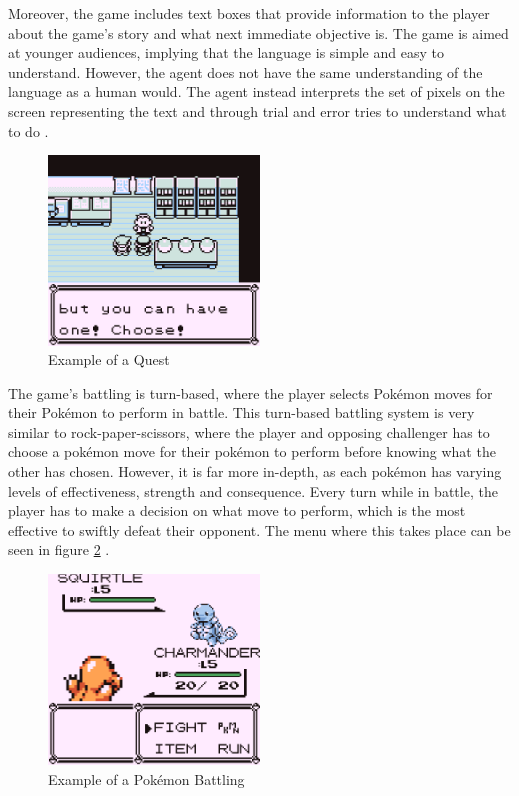 Moreover, the game includes text boxes that provide information to the player about the game's story and what next immediate objective is. The game is aimed at younger audiences, implying that the language is simple and easy to understand. However, the agent does not have the same understanding of the language as a human would. The agent instead interprets the set of pixels on the screen representing the text and through trial and error tries to understand what to do \cite{HubZ_1998}. 

\begin{figure}[H]
    \centering
    \includegraphics[width=0.5\textwidth]{figures/red_quest_example.png}
    \caption{Example of a Quest}
    \label{fig:pkmn_quest}
\end{figure}

The game's battling is turn-based, where the player selects Pokémon moves for their Pokémon to perform in battle. This turn-based battling system is very similar to rock-paper-scissors, where the player and opposing challenger has to choose a pokémon move for their pokémon to perform before knowing what the other has chosen. However, it is far more in-depth, as each pokémon has varying levels of effectiveness, strength and consequence. Every turn while in battle, the player has to make a decision on what move to perform, which is the most effective to swiftly defeat their opponent. The menu where this takes place can be seen in figure \ref{fig:pkmn_battling} \cite{HubZ_1998}.

\begin{figure}[H]
    \centering
    \includegraphics[width=0.5\textwidth]{figures/red_battling.png}
    \caption{Example of a Pokémon Battling}
    \label{fig:pkmn_battling}
\end{figure}

